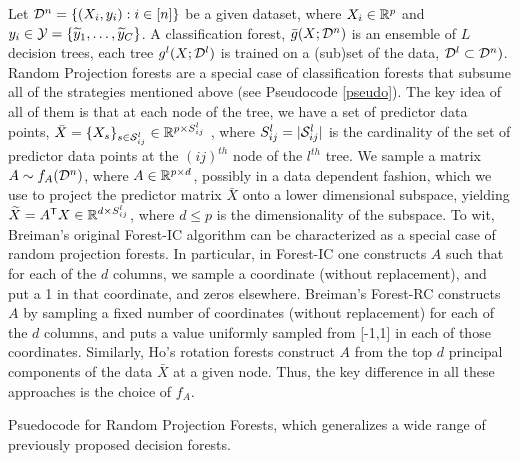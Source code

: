 \documentclass[10pt]{article}
\begin{document}
Let $\mathcal{D}^n=\{(X_i,y_i): i \in [n]\}$ be a given dataset, where $X_i \in \mathbb{R}^p$ and $y_i \in \mathcal{Y} = \{\widetilde{y}_1,\ldots, \widetilde{y}_C\}$. A classification forest, $\bar{g}(X; \mathcal{D}^n)$ is an ensemble of $L$ decision trees, each tree $g^l( X; \mathcal{D}^l)$ is trained on a (sub)set of the data, $\mathcal{D}^l \subset \mathcal{D}^n)$.
Random Projection forests are a special case of classification forests that subsume all of the strategies mentioned above (see Pseudocode \ref{pseudo}). The key idea of all of them is that at each node of the tree, we have a set of predictor data points, $\bar{X}=\{X_s\}_{s \in \mathcal{S}^l_{ij}} \in \mathbb{R}^{p \times S^l_{ij}}$ , where  $S^l_{ij}=|\mathcal{S}^l_{ij}|$ is the cardinality of the set of predictor data points at the $(ij)^{th}$ node of the $l^{th}$ tree.
We sample a matrix $A \sim f_A(\mc{D}^n)$, where $A \in \mathbb{R}^{p \times d}$, possibly in a data dependent fashion, which we use to project the predictor matrix $\bar{X}$ onto a lower dimensional subspace, yielding $\widetilde{X} = A^{\mathsf{T}} X \in \mathbb{R}^{d \times S^l_{ij}}$, where $d \leq p$ is the dimensionality of the subspace. To wit, Breiman's original Forest-IC algorithm can be characterized as a special case of random projection forests. In particular, in Forest-IC one constructs $A$ such that for each of the $d$ columns, we sample a coordinate (without replacement), and put a 1 in that coordinate, and zeros elsewhere. Breiman's Forest-RC constructs $A$ by sampling a fixed number of coordinates (without replacement) for each of the $d$ columns, and puts a value uniformly sampled from [-1,1] in each of those coordinates. Similarly, Ho's rotation forests construct $A$ from the top $d$ principal components of the data $\bar{X}$ at a given node. Thus, the key difference in all these approaches is the choice of $f_A$. 

\begin{algorithm}
  \caption{Psuedocode for Random Projection Forests, which generalizes a wide range of previously proposed decision forests.}
  \label{pseudo}
\begin{algorithmic}
   data: $\mc{D}^n = (X_i,y_i) \in (\Real^p \times \mc{Y})$ for $i \in [n]$, tree rules (stopping criteria, rules for sampling data points per tree, etc.), distributions on $d \times p$ matrices}: $A \sim f_A(\mc{D}^n)$, preprocessing rules
  \STATE {\bfseries Output:} decision trees, predictions, out of bag errors, etc. 
  \STATE Preprocess according to rule
  \FOR{each tree}
  \STATE Subsample data to obtain $(\bar{X},\bar{y})$, the set of data points to be used in this tree
  \FOR{each leaf node in tree}
  \STATE Let $\mt{X} =  A\T \bar{X} \in \Real^{d \times s}$, where $A \sim f_A(\mc{D}^n)$
  \STATE Find the ``best'' split coordinate $k^*$ in $\mt{X}$ and ``best'' split value $t^*(k^*)$ for this coordinate
  \STATE Split $X$ according to whether $X(k) > t^*(k^*)$
  \STATE Assign each child node as a leaf or terminal  node according to stopping criteria
  \ENDFOR
  \ENDFOR
  \STATE Prune trees according to rule
\end{algorithmic}
\end{algorithm}
\end{document}
